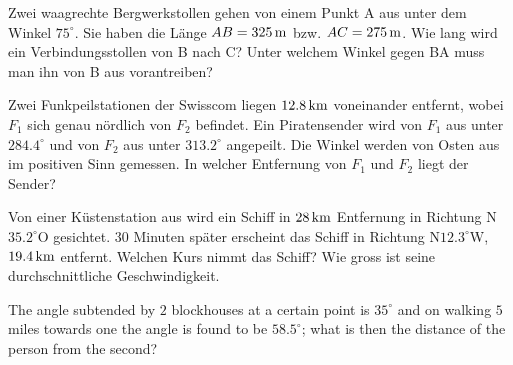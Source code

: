 \documentclass[%
11pt,%
twoside,%
titlepage,%
german,%
headsepline%
]{scrartcl}
\begin{document}
\begin{ueb}[Stollen]
Zwei waagrechte Bergwerkstollen gehen von einem Punkt A aus unter dem Winkel $75^\circ$. Sie haben die Länge $AB=\unit[325]{m}$ bzw. $AC=\unit[275]{m}$. Wie lang wird ein Verbindungsstollen von B nach C? Unter welchem Winkel gegen BA muss man ihn von B aus vorantreiben?
\end{ueb}
\begin{ueb}
Zwei Funkpeilstationen der Swisscom liegen $\unit[12.8]{km}$ voneinander entfernt, wobei $F_1$ sich genau nördlich von $F_2$ befindet. Ein Piratensender wird von $F_1$ aus unter $284.4^\circ$ und von $F_2$ aus unter $313.2^\circ$ angepeilt. Die Winkel werden von Osten aus im positiven Sinn gemessen. In welcher Entfernung von $F_1$ und $F_2$ liegt der Sender?
\end{ueb}
\begin{ueb}[Schiff]
Von einer Küstenstation aus wird ein Schiff in $\unit[28]{km}$ Entfernung in Richtung N$35.2^\circ$O gesichtet. $30$ Minuten später erscheint das Schiff in Richtung N$12.3^\circ$W, $\unit[19.4]{km}$ entfernt. Welchen Kurs nimmt das Schiff? Wie gross ist seine durchschnittliche Geschwindigkeit.
\end{ueb}
\begin{ueb}[Blockhouses]
The angle subtended by $2$ blockhouses at a certain point is $35^\circ$ and on walking $5$ miles towards one the angle is found to be $58.5^\circ$; what is then the distance of the person from the second?
\end{ueb}
\end{document}
